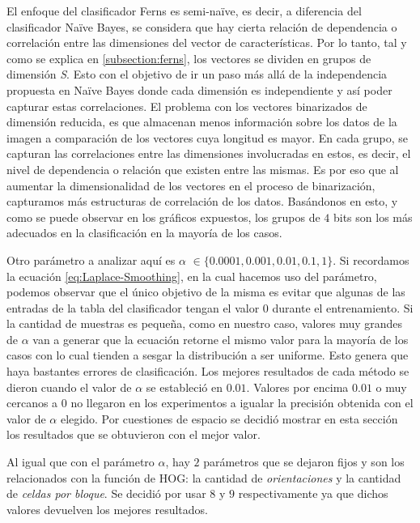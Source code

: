 	El enfoque del clasificador Ferns es semi-na\"{i}ve, es decir, a diferencia del clasificador Na\"{i}ve Bayes, se considera que hay cierta relación de dependencia o correlación entre las dimensiones del vector de características. Por lo tanto, tal y como se explica en \ref{subsection:ferns}, los vectores se dividen en grupos de dimensión \textit{S}. Esto con el objetivo de ir un paso más allá de la independencia propuesta en Na\"{i}ve Bayes donde cada dimensión es independiente y así poder capturar estas correlaciones. El problema con los vectores binarizados de dimensión reducida, es que almacenan menos información sobre los datos de la imagen a comparación de los vectores cuya longitud es mayor. En cada grupo, se capturan las correlaciones entre las dimensiones involucradas en estos, es decir, el nivel de dependencia o relación que existen entre las mismas. Es por eso que al aumentar la dimensionalidad de los vectores en el proceso de binarización, capturamos más estructuras de correlación de los datos. Basándonos en esto, y como se puede observar en los gráficos expuestos, los grupos de $4$ bits son los más adecuados en la clasificación en la mayoría de los casos.

	Otro parámetro a analizar aquí es \textit{$\alpha$} $\in \{ 0.0001, 0.001, 0.01, 0.1, 1\}$. Si recordamos la ecuación \ref{eq:Laplace-Smoothing}, en la cual hacemos uso del parámetro, podemos observar que el único objetivo de la misma es evitar que algunas de las entradas de la tabla del clasificador tengan el valor $0$ durante el entrenamiento. Si la cantidad de muestras es pequeña, como en nuestro caso, valores muy grandes de $\alpha$ van a generar que la ecuación retorne el mismo valor para la mayoría de los casos con lo cual tienden a sesgar la distribución a ser uniforme.  Esto genera que haya bastantes errores de clasificación. Los mejores resultados de cada método se dieron cuando el valor de \textit{$\alpha$} se estableció en $0.01$. Valores por encima $0.01$ o muy cercanos a 0 no llegaron en los experimentos a igualar la precisión obtenida con el valor de \textit{$\alpha$} elegido. Por cuestiones de espacio se decidió mostrar en esta sección los resultados que se obtuvieron con el mejor valor.

	Al igual que con el parámetro \textit{$\alpha$}, hay $2$ parámetros que se dejaron fijos y son los relacionados con la función de HOG: la cantidad de \textit{orientaciones} y la cantidad de \textit{celdas por bloque}. Se decidió por usar $8$ y $9$ respectivamente ya que dichos valores devuelven los mejores resultados.


